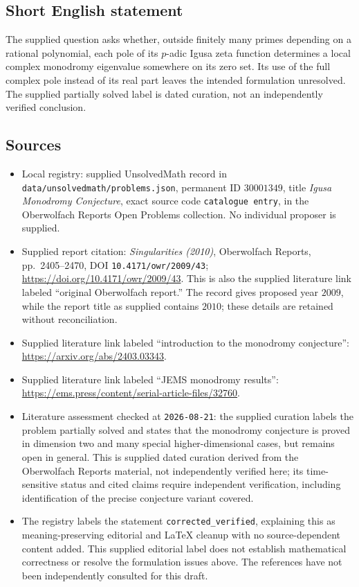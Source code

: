 \documentclass[11pt]{article}
\begin{document}
\subsection{Short English statement}
The supplied question asks whether, outside finitely many primes depending on a rational polynomial, each pole of its \(p\)-adic Igusa zeta function determines a local complex monodromy eigenvalue somewhere on its zero set. Its use of the full complex pole instead of its real part leaves the intended formulation unresolved. The supplied partially solved label is dated curation, not an independently verified conclusion.
\subsection{Sources}
\begin{itemize}
\item Local registry: supplied UnsolvedMath record in \texttt{data/unsolvedmath/problems.json}, permanent ID \(30001349\), title \emph{Igusa Monodromy Conjecture}, exact source code \texttt{catalogue entry}, in the Oberwolfach Reports Open Problems collection. No individual proposer is supplied.
\item Supplied report citation: \emph{Singularities (2010)}, Oberwolfach Reports, pp.\ 2405--2470, DOI \texttt{10.4171/owr/2009/43}; \url{https://doi.org/10.4171/owr/2009/43}. This is also the supplied literature link labeled ``original Oberwolfach report.'' The record gives proposed year \(2009\), while the report title as supplied contains \(2010\); these details are retained without reconciliation.
\item Supplied literature link labeled ``introduction to the monodromy conjecture'': \url{https://arxiv.org/abs/2403.03343}.
\item Supplied literature link labeled ``JEMS monodromy results'': \url{https://ems.press/content/serial-article-files/32760}.
\item Literature assessment checked at \texttt{2026-08-21}: the supplied curation labels the problem partially solved and states that the monodromy conjecture is proved in dimension two and many special higher-dimensional cases, but remains open in general. This is supplied dated curation derived from the Oberwolfach Reports material, not independently verified here; its time-sensitive status and cited claims require independent verification, including identification of the precise conjecture variant covered.
\item The registry labels the statement \texttt{corrected\_verified}, explaining this as meaning-preserving editorial and LaTeX cleanup with no source-dependent content added. This supplied editorial label does not establish mathematical correctness or resolve the formulation issues above. The references have not been independently consulted for this draft.
\end{itemize}
\end{document}
